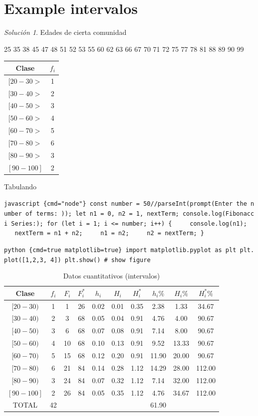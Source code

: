 \documentclass[10pt,]{krantz}
\theoremstyle{definition}
\theoremstyle{definition}
\theoremstyle{definition}
\theoremstyle{definition}
\theoremstyle{remark}
\newtheorem*{solution}{Solución}
\begin{document}
\hypertarget{example-intervalos}{%
\section{Example intervalos}\label{example-intervalos}}

\begin{solution}
{}
Edades de cierta comunidad

25
35 38
45 47 48
51 52 53 55
60 62 63 66 67
70 71 72 75 77 78
81 88 89
90 99

\begin{longtable}[]{@{}cc@{}}
\toprule
Clase & \(f_i\)\tabularnewline
\midrule
\endhead
\([20-30>\) & 1\tabularnewline
\([30-40>\) & 2\tabularnewline
\([40-50>\) & 3\tabularnewline
\([50-60>\) & 4\tabularnewline
\([60-70>\) & 5\tabularnewline
\([70-80>\) & 6\tabularnewline
\([80-90>\) & 3\tabularnewline
\([90-100]\) & 2\tabularnewline
\bottomrule
\end{longtable}
\end{solution}

Tabulando

\texttt{javascript\ \{cmd="node"\}\ const\ number\ =\ 50//parseInt(prompt(\textquotesingle{}Enter\ the\ number\ of\ terms:\ \textquotesingle{}));\ let\ n1\ =\ 0,\ n2\ =\ 1,\ nextTerm;\ console.log(\textquotesingle{}Fibonacci\ Series:\textquotesingle{});\ for\ (let\ i\ =\ 1;\ i\ \textless{}=\ number;\ i++)\ \{\ \ \ \ \ console.log(n1);\ \ \ \ \ nextTerm\ =\ n1\ +\ n2;\ \ \ \ \ n1\ =\ n2;\ \ \ \ \ n2\ =\ nextTerm;\ \}}

\texttt{python\ \{cmd=true\ matplotlib=true\}\ import\ matplotlib.pyplot\ as\ plt\ plt.plot({[}1,2,3,\ 4{]})\ plt.show()\ \#\ show\ figure}

\begin{longtable}[t]{cccccccccc}
\caption{\label{tab:cuantitativa}Datos cuantitativos (intervalos)}\\
\toprule
Clase & $f_i$ & $F_i$ & $F_i^*$ & $h_i$ & $H_i$ & $H_i^*$ & $h_i\%$ & $H_i\%$ & $H_i^*\%$\\
\midrule
$[20-30)$ & 1 & 1 & 26 & 0.02 & 0.01 & 0.35 & 2.38 & 1.33 & 34.67\\
$[30-40)$ & 2 & 3 & 68 & 0.05 & 0.04 & 0.91 & 4.76 & 4.00 & 90.67\\
$[40-50)$ & 3 & 6 & 68 & 0.07 & 0.08 & 0.91 & 7.14 & 8.00 & 90.67\\
$[50-60)$ & 4 & 10 & 68 & 0.10 & 0.13 & 0.91 & 9.52 & 13.33 & 90.67\\
$[60-70)$ & 5 & 15 & 68 & 0.12 & 0.20 & 0.91 & 11.90 & 20.00 & 90.67\\
$[70-80)$ & 6 & 21 & 84 & 0.14 & 0.28 & 1.12 & 14.29 & 28.00 & 112.00\\
$[80-90)$ & 3 & 24 & 84 & 0.07 & 0.32 & 1.12 & 7.14 & 32.00 & 112.00\\
$[90-100]$ & 2 & 26 & 84 & 0.05 & 0.35 & 1.12 & 4.76 & 34.67 & 112.00\\
TOTAL & 42 &  &  &  &  &  & 61.90 &  & \\
\bottomrule
\end{longtable}
\end{document}
